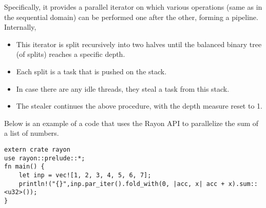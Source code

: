 Specifically, it provides a parallel iterator on which various operations (same as in the sequential domain) can be performed one after the other, forming a pipeline. Internally,
\begin{itemize}
    \item This iterator is split recursively into two halves until the balanced binary tree (of splits) reaches a specific depth.
    \item Each split is a task that is pushed on the stack.
    \item In case there are any idle threads, they steal a task from this stack.
    \item The stealer continues the above procedure, with the depth measure reset to 1.
\end{itemize}
Below is an example of a code that uses the Rayon API to parallelize the sum of a list of numbers.
\begin{verbatim}
extern crate rayon
use rayon::prelude::*;
fn main() {
    let inp = vec![1, 2, 3, 4, 5, 6, 7];
    println!("{}",inp.par_iter().fold_with(0, |acc, x| acc + x).sum::<u32>());
}
\end{verbatim}
%
%
%
